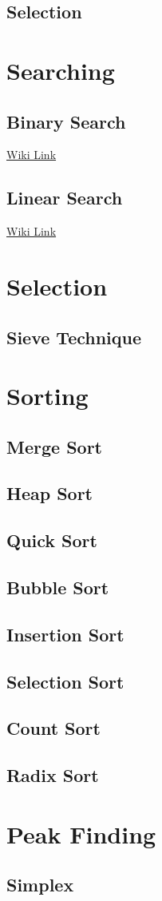 \subsection{Selection}

\section{Searching}
\subsection{Binary Search}

\href{https://en.wikipedia.org/wiki/Binary_search_algorithm}{Wiki Link}

\subsection{Linear Search}

\href{https://en.wikipedia.org/wiki/Linear_search}{Wiki Link}

\section{Selection}
\subsection{Sieve Technique}

\section{Sorting}
\subsection{Merge Sort}
\subsection{Heap Sort}
\subsection{Quick Sort}
\subsection{Bubble Sort}
\subsection{Insertion Sort}
\subsection{Selection Sort}
\subsection{Count Sort}
\subsection{Radix Sort}
\section{Peak Finding}
\subsection{Simplex}

